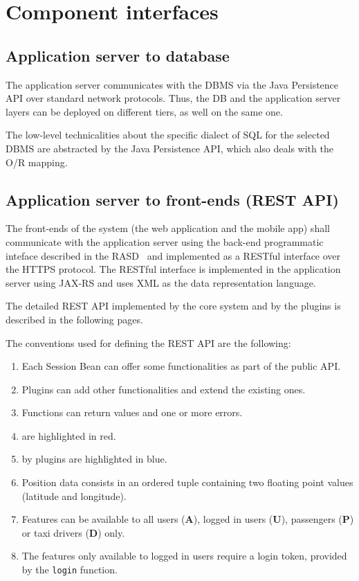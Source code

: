\section{Component interfaces}
\label{sec:component-interfaces}

\subsection{Application server to database}
The application server communicates with the DBMS via the Java Persistence API over standard network protocols. Thus, the DB and the application server layers can be deployed on different tiers, as well on the same one.

The low-level technicalities about the specific dialect of SQL for the selected DBMS are abstracted by the Java Persistence API, which also deals with the O/R mapping.

\subsection{Application server to front-ends (REST API)}
\label{sec:rest-api}
The front-ends of the system (the web application and the mobile app) shall communicate with the application server using the back-end programmatic inteface described in the RASD~\cite{rasd} and implemented as a RESTful interface over the HTTPS protocol.
The RESTful interface is implemented in the application server using JAX-RS and uses XML as the data representation language.

The detailed REST API implemented by the core system and by the plugins is described in the following pages.

The conventions used for defining the REST API are the following:
\begin{enumerate}
    \item Each Session Bean can offer some functionalities as part of the public API.
    \item Plugins can add other functionalities and extend the existing ones.
    \item Functions can return values and one or more errors.
    \item {} are highlighted in red.
    \item {} by plugins are highlighted in blue.
    \item Position data consists in an ordered tuple containing two floating point values (latitude and longitude).
    \item Features can be available to all users (\textbf{A}), logged in users (\textbf{U}), passengers (\textbf{P}) or taxi drivers (\textbf{D}) only.
    \item The features only available to logged in users require a login token, provided by the \texttt{login} function.
\end{enumerate}

